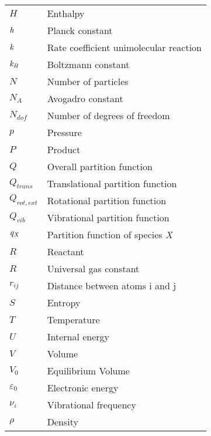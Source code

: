 \begin{longtable}{p{} p{}}
$ H $ & Enthalpy\\
$\it{h}$ & Planck constant\\
$ \it{k} $ & Rate coefficient unimolecular reaction\\ 
$ \it{k}_{B} $ & Boltzmann constant\\
$ N $ & Number of particles\\
$ N_{A} $ & Avogadro constant \\
$ N_{dof} $ & Number of degrees of freedom \\
$ p $ & Pressure\\
$ P $ & Product \\
$ Q $ & Overall partition function\\
$ Q_{trans} $ & Translational partition function \\
$ Q_{rot,ext} $ & Rotational partition function \\
$ Q_{vib} $ & Vibrational partition function \\
$ \it{q_X} $ & Partition function of species \it{X}\\
$ R $ & Reactant \\
$ R $ & Universal gas constant \\
$ r_{ij} $ & Distance between atoms i and j\\
$ S $ & Entropy\\
$ T $ & Temperature \\
$ U $ & Internal energy\\
$ V $ & Volume\\
$ V_0 $ & Equilibrium Volume\\
$ \varepsilon_0 $ & Electronic energy \\
$ \nu_{i}$ & Vibrational frequency \\ 
$ \rho $ & Density\\ \hline

\end{longtable}

